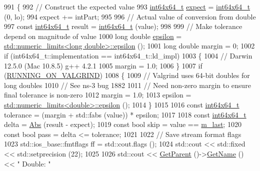 \begin{DoxyCode}
991 \{
992   \textcolor{comment}{// Construct the expected value}
993   \hyperlink{classint64x64__t}{int64x64\_t} \hyperlink{doc_2readme_8txt_a11460adc33d00ccf94a559cdd45990ea}{expect} = \hyperlink{classint64x64__t}{int64x64\_t} (0, lo);
994   expect += intPart;
995 
996   \textcolor{comment}{// Actual value of conversion from double}
997   \textcolor{keyword}{const} \hyperlink{classint64x64__t}{int64x64\_t} result = \hyperlink{classint64x64__t}{int64x64\_t} (value);
998 
999   \textcolor{comment}{// Make tolerance depend on magnitude of value}
1000   \textcolor{keywordtype}{long} \textcolor{keywordtype}{double} \hyperlink{tv-spectrum-transmitter-test_8cc_a4904cc82627458fdf6672ccc0b2802c7}{epsilon} = \hyperlink{tv-spectrum-transmitter-test_8cc_a4904cc82627458fdf6672ccc0b2802c7}{std::numeric\_limits<long double>::epsilon}
       ();
1001   \textcolor{keywordtype}{long} \textcolor{keywordtype}{double} margin = 0;
1002   \textcolor{keywordflow}{if} (int64x64\_t::implementation == int64x64\_t::ld\_impl)
1003     \{
1004       \textcolor{comment}{// Darwin 12.5.0 (Mac 10.8.5) g++ 4.2.1}
1005       margin = 1.0;
1006     \}
1007   \textcolor{keywordflow}{if} (\hyperlink{valgrind_8h_a9f00625a835e796e264069df36212a1c}{RUNNING\_ON\_VALGRIND})
1008     \{
1009       \textcolor{comment}{// Valgrind uses 64-bit doubles for long doubles}
1010       \textcolor{comment}{// See ns-3 bug 1882}
1011       \textcolor{comment}{// Need non-zero margin to ensure final tolerance is non-zero}
1012       margin = 1.0;
1013       epsilon = \hyperlink{tv-spectrum-transmitter-test_8cc_a4904cc82627458fdf6672ccc0b2802c7}{std::numeric\_limits<double>::epsilon} ();
1014     \}
1015 
1016   \textcolor{keyword}{const} \hyperlink{classint64x64__t}{int64x64\_t} tolerance = (margin + std::fabs (value)) * epsilon;
1017   
1018   \textcolor{keyword}{const} \hyperlink{classint64x64__t}{int64x64\_t} delta = \hyperlink{group__highprec_gabf87260a0ba68d152ae95568b2ef58fe}{Abs} (result - expect);
1019   \textcolor{keyword}{const} \textcolor{keywordtype}{bool} skip = value == \hyperlink{classns3_1_1int64x64_1_1test_1_1Int64x64DoubleTestCase_a8ac90dc336e01dc3de2475f47ec10060}{m\_last};
1020   \textcolor{keyword}{const} \textcolor{keywordtype}{bool} pass = delta <= tolerance;
1021   
1022   \textcolor{comment}{// Save stream format flags}
1023   std::ios\_base::fmtflags ff = std::cout.flags ();
1024   std::cout << std::fixed << std::setprecision (22);
1025   
1026   std::cout << \hyperlink{classns3_1_1TestCase_af41db0462b844c9f81838d0e61ecd563}{GetParent} ()->\hyperlink{classns3_1_1TestCase_a28f7bb59669c24dae1c290fc17fc9b62}{GetName} () << \textcolor{stringliteral}{" Double: "}

\end{DoxyCode}
